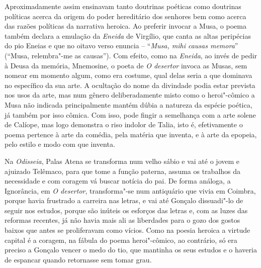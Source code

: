 Aproximadamente assim ensinavam tanto doutrinas poéticas como doutrinas
políticas acerca da origem do poder hereditário dos senhores bem como acerca das
razões políticas da narrativa heroica.  Ao preferir invocar a Musa, o poema
também declara a emulação da \textit{Eneida} de Virgílio, que canta as altas
peripécias do pio Eneias e que no oitavo verso enuncia -- ``\textit{Musa, mihi
causas memora}'' (``Musa, relembra"-me as causas''). Com efeito, como na
\textit{Eneida}, ao invés de pedir à Deusa da memória, Mnemosine, o poeta de
\textit{O desertor} invoca as Musas, sem nomear em momento algum, como era
costume, qual delas seria a que dominava no específico da sua arte. A ocultação
do nome da divindade podia estar prevista nos usos da arte, mas num gênero  deliberadamente misto como o heroi"-cômico a Musa não indicada
principalmente mantém dúbia a natureza da espécie poética, já
também por isso cômica. Com isso, pode fingir a semelhança com a arte solene de
Calíope, mas logo demonstra o riso indolor de Talia, isto é, efetivamente o
poema pertence à arte da comédia, pela matéria que inventa, e à arte da epopeia,
pelo estilo e modo com que inventa.


Na \textit{Odisseia}, Palas Atena se transforma num velho sábio e vai até o
jovem e ajuizado Telêmaco, para que tome a função paterna, assuma os trabalhos
da necessidade e com coragem vá buscar notícia do pai. De forma análoga, a
Ignorância, em \textit{O desertor}, transforma"-se num antiquário que vivia em
Coimbra, porque havia frustrado a carreira nas letras, e vai até Gonçalo
dissuadi"-lo de seguir nos estudos, porque são inúteis os esforços das letras e,
com as luzes das reformas recentes, já não havia mais ali as liberdades para o
gozo dos gostos baixos que antes se proliferavam como vícios.  Como na poesia
heroica a virtude capital é a coragem, na fábula do poema heroi"-cômico, ao
contrário, só era preciso a Gonçalo vencer o medo do tio, que mantinha os seus
estudos e o haveria de espancar quando retornasse sem tomar grau.


